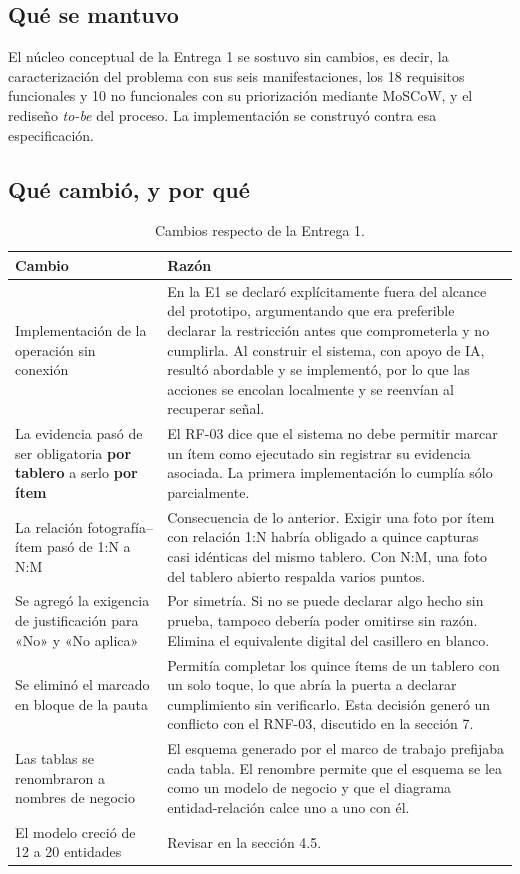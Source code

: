 \documentclass[10pt,letterpaper]{article}
\begin{document}
\subsection{Qué se mantuvo}

El núcleo conceptual de la Entrega 1 se sostuvo sin cambios, es decir, la
caracterización del problema con sus seis manifestaciones, los 18 requisitos
funcionales y 10 no funcionales con su priorización mediante MoSCoW, y el rediseño
\emph{to-be} del proceso. La implementación se construyó contra esa especificación.

\subsection{Qué cambió, y por qué}

\begin{table}[H]
\centering
\small
\begin{tabular}{@{}p{4.3cm}p{10.7cm}@{}}
\toprule
\textbf{Cambio} & \textbf{Razón} \\
\midrule
Implementación de la operación sin conexión& En la E1 se declaró explícitamente fuera del alcance del prototipo,
argumentando que era preferible declarar la restricción antes que comprometerla
y no cumplirla. Al construir el sistema, con apoyo de IA, resultó abordable y se implementó, por lo que las acciones se encolan localmente y se reenvían al recuperar señal.\\
\addlinespace
La evidencia pasó de ser obligatoria \textbf{por tablero} a serlo \textbf{por ítem}& El RF-03 dice  que el sistema no debe permitir marcar un ítem
como ejecutado sin registrar su evidencia asociada. La primera implementación
lo cumplía sólo parcialmente. \\
\addlinespace
La relación fotografía--ítem pasó de 1:N a N:M
& Consecuencia de lo anterior. Exigir una foto por ítem con relación 1:N
habría obligado a quince capturas casi idénticas del mismo tablero. Con N:M,
una foto del tablero abierto respalda varios puntos. \\
\addlinespace
Se agregó la exigencia de justificación para «No» y «No aplica»
& Por simetría. Si no se puede declarar algo hecho sin prueba, tampoco debería
poder omitirse sin razón. Elimina el equivalente digital del casillero en
blanco. \\
\addlinespace
Se eliminó el marcado en bloque de la pauta
& Permitía completar los quince ítems de un tablero con un solo toque, lo que
abría la puerta a declarar cumplimiento sin verificarlo. Esta decisión generó
un conflicto con el RNF-03, discutido en la sección 7. \\
\addlinespace
Las tablas se renombraron a nombres de negocio
& El esquema generado por el marco de trabajo prefijaba cada tabla. El
renombre permite que el esquema se lea como un modelo de negocio y que el
diagrama entidad-relación calce uno a uno con él. \\
\addlinespace
El modelo creció de 12 a 20 entidades
& Revisar en la sección 4.5. \\
\bottomrule
\end{tabular}
\caption{Cambios respecto de la Entrega 1.}
\end{table}
\end{document}

